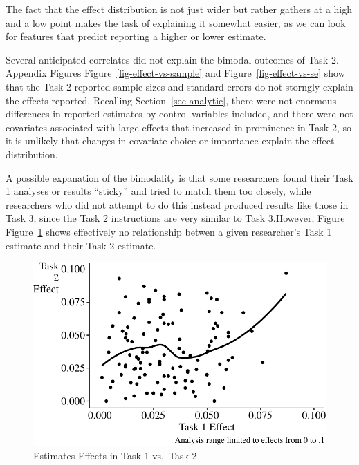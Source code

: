 \documentclass[
  letterpaper,
  DIV=11,
  numbers=noendperiod]{scrartcl}
\begin{document}
The fact that the effect distribution is not just wider but rather
gathers at a high and a low point makes the task of explaining it
somewhat easier, as we can look for features that predict reporting a
higher or lower estimate.

Several anticipated correlates did not explain the bimodal outcomes of
Task 2. Appendix Figures Figure~\ref{fig-effect-vs-sample} and
Figure~\ref{fig-effect-vs-se} show that the Task 2 reported sample sizes
and standard errors do not storngly explain the effects reported.
Recalling Section~\ref{sec-analytic}, there were not enormous
differences in reported estimates by control variables included, and
there were not covariates associated with large effects that increased
in prominence in Task 2, so it is unlikely that changes in covariate
choice or importance explain the effect distribution.

A possible expanation of the bimodality is that some researchers found
their Task 1 analyses or results ``sticky'' and tried to match them too
closely, while researchers who did not attempt to do this instead
produced results like those in Task 3, since the Task 2 instructions are
very similar to Task 3.However, Figure Figure~\ref{fig-task-1-vs-2}
shows effectively no relationship betwen a given researcher's Task 1
estimate and their Task 2 estimate.

\begin{figure}

{\centering \includegraphics{The-Sources-of-Researcher-Variation-in-Economics_files/figure-pdf/fig-task-1-vs-2-1.pdf}

}

\caption{\label{fig-task-1-vs-2}Estimates Effects in Task 1 vs.~Task 2}

\end{figure}
\end{document}
